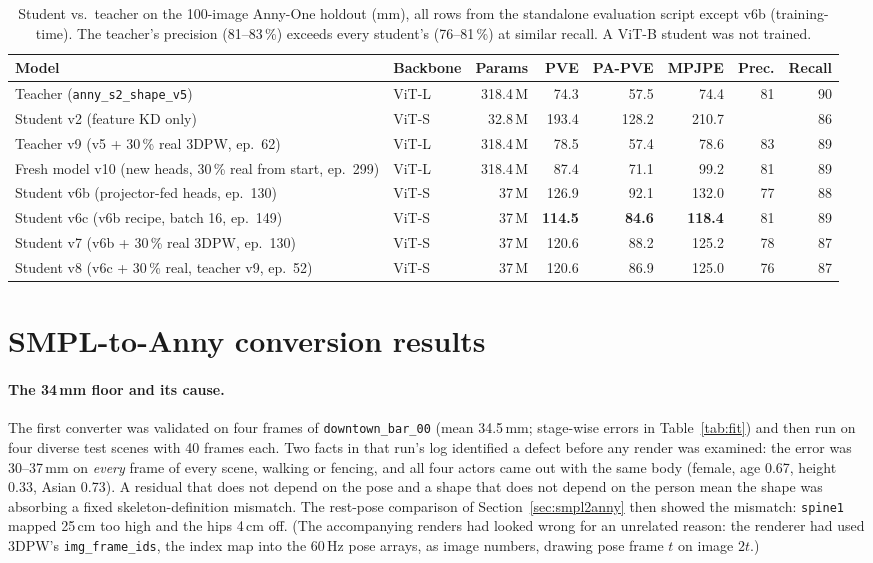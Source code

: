 \begin{table}[h]
\centering\small
\begin{tabular}{llrrrrrr}
\toprule
Model & Backbone & Params & PVE & PA-PVE & MPJPE & Prec. & Recall \\
\midrule
Teacher (\texttt{anny\_s2\_shape\_v5}) & ViT-L & 318.4\,M & 74.3 & 57.5 & 74.4 & 81 & 90 \\
Student v2 (feature KD only) & ViT-S & 32.8\,M & 193.4 & 128.2 & 210.7 & & 86 \\
Teacher v9 (v5 + 30\,\% real 3DPW, ep.\ 62) & ViT-L & 318.4\,M & 78.5 & 57.4 & 78.6 & 83 & 89 \\
Fresh model v10 (new heads, 30\,\% real from start, ep.\ 299) & ViT-L & 318.4\,M & 87.4 & 71.1 & 99.2 & 81 & 89 \\
Student v6b (projector-fed heads, ep.\ 130) & ViT-S & 37\,M & 126.9 & 92.1 & 132.0 & 77 & 88 \\
Student v6c (v6b recipe, batch 16, ep.\ 149) & ViT-S & 37\,M & \textbf{114.5} & \textbf{84.6} & \textbf{118.4} & 81 & 89 \\
Student v7 (v6b + 30\,\% real 3DPW, ep.\ 130) & ViT-S & 37\,M & 120.6 & 88.2 & 125.2 & 78 & 87 \\
Student v8 (v6c + 30\,\% real, teacher v9, ep.\ 52) & ViT-S & 37\,M & 120.6 & 86.9 & 125.0 & 76 & 87 \\
\bottomrule
\end{tabular}
\caption{Student vs.\ teacher on the 100-image Anny-One holdout (mm), all
rows from the standalone evaluation script except v6b (training-time). The
teacher's precision (81--83\,\%) exceeds every student's (76--81\,\%) at
similar recall. A ViT-B student was not trained.}
\label{tab:kd_eval}
\end{table}

\section{SMPL-to-Anny conversion results}
\label{sec:fit_results}

\paragraph{The 34\,mm floor and its cause.} The first converter was validated
on four frames of \texttt{downtown\_bar\_00} (mean 34.5\,mm; stage-wise errors
in Table~\ref{tab:fit}) and then run on four diverse test scenes with 40
frames each. Two facts in that run's log identified a defect before any
render was examined: the error was 30--37\,mm on \emph{every} frame of every
scene, walking or fencing, and all four actors came out with the same body
(female, age 0.67, height 0.33, Asian 0.73). A residual that does not depend
on the pose and a shape that does not depend on the person mean the shape
was absorbing a fixed skeleton-definition mismatch. The rest-pose comparison
of Section~\ref{sec:smpl2anny} then showed the mismatch: \texttt{spine1} mapped
25\,cm too high and the hips 4\,cm off. (The accompanying renders had looked
wrong for an unrelated reason: the renderer had used 3DPW's
\texttt{img\_frame\_ids}, the index map into the 60\,Hz pose arrays, as image
numbers, drawing pose frame $t$ on image $2t$.)


